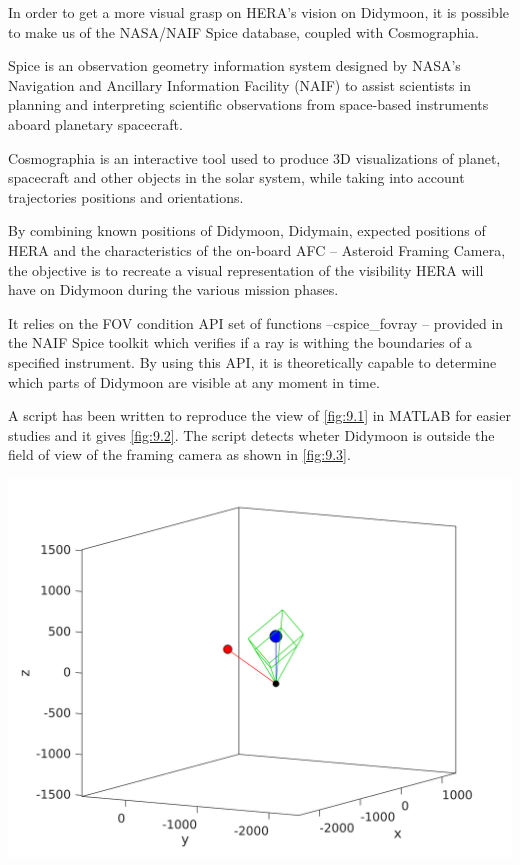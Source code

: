 In order to get a more visual grasp on HERA's vision on Didymoon, it is possible to make us of the NASA/NAIF Spice database, coupled with Cosmographia. 

Spice is an observation geometry information system designed by NASA's Navigation and Ancillary Information Facility (NAIF) to assist scientists in planning and interpreting scientific observations from space-based instruments aboard planetary spacecraft. 

Cosmographia is an interactive tool used to produce 3D visualizations of planet, spacecraft and other objects in the solar system, while taking into account trajectories positions and orientations. 

By combining known positions of Didymoon, Didymain, expected positions of HERA and the characteristics of the on-board AFC -- Asteroid Framing Camera, the objective is to recreate a visual representation of the visibility HERA will have on Didymoon during the various mission phases. 

It relies on the FOV condition API set of functions --cspice\_fovray -- provided in the NAIF Spice toolkit which verifies if a ray is withing the boundaries of a specified instrument. By using this API, it is theoretically capable to determine which parts of Didymoon are visible at any moment in time. 

A script has been written to reproduce the view of \autoref{fig:9.1} in MATLAB for easier studies and it gives \autoref{fig:9.2}. The script detects wheter Didymoon is outside the field of view of the framing camera as shown in \autoref{fig:9.3}.

\begin{center}
    \includegraphics[width=0.6\linewidth]{rsc/cosmo-matlab3.png}
    \label{fig:9.3}
\end{center}

